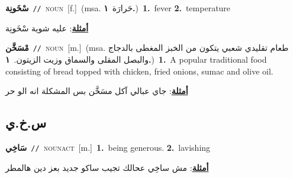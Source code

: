 \documentclass[10pt,a4paper,twoside]{article} %
\begin{document}
\begin{multicols}{2}
{\setlength\topsep{0pt}\textbf{\foreignlanguage{arabic}{سْخَونِة}}\ {\color{gray}\texttt{//}\color{black}}\ \textsc{noun}\ [f.]\ \color{gray}(msa. \foreignlanguage{arabic}{حَرارَة}~\foreignlanguage{arabic}{\textbf{١.}})\color{black}\ \textbf{1.}~fever  \textbf{2.}~temperature\  \begin{flushright}\color{gray}\foreignlanguage{arabic}{\textbf{\underline{\foreignlanguage{arabic}{أمثلة}}}: عليه شوية سْخَونِة}\end{flushright}\color{black}} \vspace{2mm}

{\setlength\topsep{0pt}\textbf{\foreignlanguage{arabic}{مْسَخَّن}}\ {\color{gray}\texttt{//}\color{black}}\ \textsc{noun}\ [m.]\ \color{gray}(msa. \foreignlanguage{arabic}{طعام تقليدي شعبي يتكون من الخبز المغطى بالدجاج والبصل المقلى والسماق وزيت الزيتون.}~\foreignlanguage{arabic}{\textbf{١.}})\color{black}\ \textbf{1.}~A popular traditional food consisting of bread topped with chicken, fried onions, sumac and olive oil.\  \begin{flushright}\color{gray}\foreignlanguage{arabic}{\textbf{\underline{\foreignlanguage{arabic}{أمثلة}}}: جاي عبالي آكل مسَخَّن بس المشكلة انه الو حر}\end{flushright}\color{black}} \vspace{2mm}

\vspace{-3mm}
\subsection*{\color{blue}\foreignlanguage{arabic}{س.خ.ي}\color{blue}{}} 

{\setlength\topsep{0pt}\textbf{\foreignlanguage{arabic}{سَاخِي}}\ {\color{gray}\texttt{//}\color{black}}\ \textsc{noun\textunderscore act}\ [m.]\ \textbf{1.}~being generous.  \textbf{2.}~lavishing\  \begin{flushright}\color{gray}\foreignlanguage{arabic}{\textbf{\underline{\foreignlanguage{arabic}{أمثلة}}}: مش ساخِي عحالك تجيب ساكو جديد بعز دين هالمطر}\end{flushright}\color{black}} \vspace{2mm}


\end{multicols}
\end{document}
